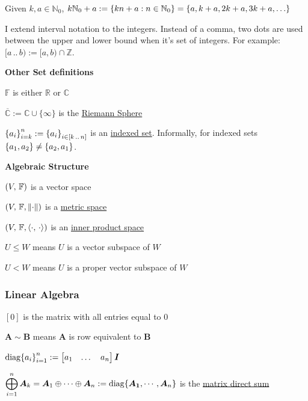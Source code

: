 \documentclass[11pt]{article}
\begin{document}
  Given \(k, a \in \mathbb{N}_0\),
  \(k\mathbb{N}_0 + a:= \brc{kn + a : n \in \mathbb{N}_0} = \brc{a, k + a, 2k + a, 3k + a, \dots}\)

  I extend interval notation to the integers. Instead of a comma, two dots are used between the upper and lower bound when it's set
  of integers. For example: \([a\,..\,b) := [a, b) \cap \mathbb{Z}\).

  \textbf{Other Set definitions}

  \(\mathbb{F}\) is either \(\mathbb{R}\) or \(\mathbb{C}\)

  \(\overbar{\mathbb{C}} := \mathbb{C} \cup \{\infty\}\) is the \href{https://www.wikiwand.com/en/Riemann_sphere}{Riemann Sphere}

  \({\left\{ a_i \right\}}_{i = k}^n := {\left\{ a_i \right\}}_{i \in [k\,..\,n]}\) is an \href{https://www.wikiwand.com/en/Index_set}{indexed set}.
  Informally, for indexed sets \({\left\{ a_1, a_2 \right\}} \neq {\left\{ a_2, a_1 \right\}}\).

  \textbf{Algebraic Structure}

  \({\left( V,\, \mathbb{F} \right)}\) is a vector space

  \({\left( V,\, \mathbb{F}, \left\lVert\cdot\right\rVert \right)}\) is a
  \href{https://brilliant.org/wiki/metric-space/}{metric space}

  \({\left( V,\, \mathbb{F}, \left\langle\cdot,\, \cdot\right\rangle \right)}\) is an
  \href{https://brilliant.org/wiki/inner-product-space/}{inner product space}

  \(U \le W\) means \(U\) is a vector subspace of \(W\)

  \(U < W\) means \(U\) is a proper vector subspace of \(W\)

  \pagebreak

  \subsubsection{Linear Algebra}

  \([0]\) is the matrix with all entries equal to \(0\)

  \(\bm{A} \sim \bm{B}\) means \(\bm{A}\) is row equivalent to \(\bm{B}\)

  \(\mathrm{diag}{\left\{ a_i \right\}}_{i = 1}^n :=
  \begin{bmatrix} a_1 & \dots & a_n\end{bmatrix} \bm{I}\)

  \(\displaystyle \bigoplus_{i = 1}^n \bm{A}_k = \bm{A}_1 \oplus \cdots \oplus \bm{A}_n := \mathrm{diag}{\left\{ \bm{A_1}, \cdots, \bm{A}_n \right\}}\) is
  the \href{https://www.wikiwand.com/en/Matrix_addition#Direct_sum}{matrix direct sum}
\end{document}
